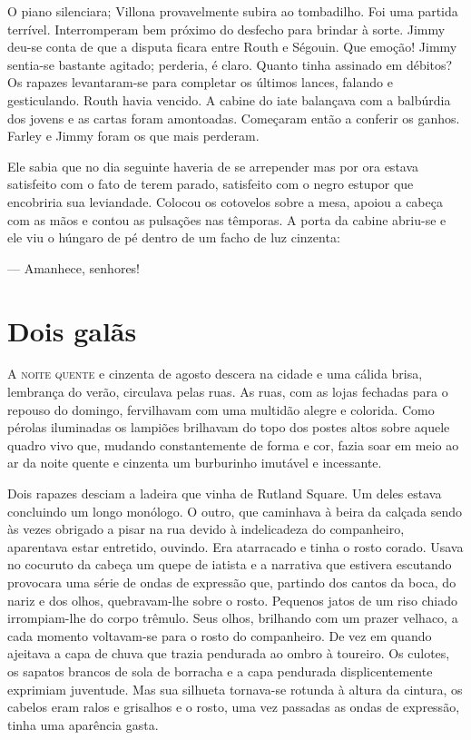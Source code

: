 O piano silenciara; Villona provavelmente subira ao tombadilho. Foi
uma partida terrível. Interromperam bem próximo do desfecho para
brindar à sorte. Jimmy deu-se conta de que a disputa ficara entre
Routh e Ségouin. Que emoção! Jimmy sentia-se bastante agitado;
perderia, é claro. Quanto tinha assinado em débitos? Os rapazes
levantaram-se para completar os últimos lances, falando e
gesticulando. Routh havia vencido. A cabine do iate balançava com a
balbúrdia dos jovens e as cartas foram amontoadas. Começaram então a
conferir os ganhos. Farley e Jimmy foram os que mais perderam.

Ele sabia que no dia seguinte haveria de se arrepender mas por ora
estava satisfeito com o fato de terem parado, satisfeito com o negro
estupor que encobriria sua leviandade. Colocou os cotovelos sobre a
mesa, apoiou a cabeça com as mãos e contou as pulsações nas têmporas.
A porta da cabine abriu-se e ele viu o húngaro de pé dentro de um
facho de luz cinzenta:

--- Amanhece, senhores!

\chapter{Dois galãs}

\textsc{A noite quente} e cinzenta de agosto descera na cidade e uma cálida
brisa, lembrança do verão, circulava pelas ruas. As ruas, com as lojas
fechadas para o repouso do domingo, fervilhavam com uma multidão
alegre e colorida. Como pérolas iluminadas os lampiões brilhavam do
topo dos postes altos sobre aquele quadro vivo que, mudando
constantemente de forma e cor, fazia soar em meio ao ar da noite
quente e cinzenta um burburinho imutável e incessante.

Dois rapazes desciam a ladeira que vinha de Rutland Square. Um deles
estava concluindo um longo monólogo. O outro, que caminhava à beira da
calçada sendo às vezes obrigado a pisar na rua devido à indelicadeza
do companheiro, aparentava estar entretido, ouvindo. Era atarracado
e tinha o rosto corado. Usava no cocuruto da cabeça um quepe de
iatista e a narrativa que estivera escutando provocara uma série de
ondas de expressão que, partindo dos cantos da boca, do nariz e dos
olhos, quebravam-lhe sobre o rosto. Pequenos jatos de um riso chiado
irrompiam-lhe do corpo trêmulo. Seus olhos, brilhando com um prazer
velhaco, a cada momento voltavam-se para o rosto do companheiro. De
vez em quando ajeitava a capa de chuva que trazia pendurada ao ombro à
toureiro. Os culotes, os sapatos brancos de sola de
borracha e a capa pendurada displicentemente exprimiam juventude. Mas sua
silhueta tornava-se rotunda à altura da cintura, os cabelos eram ralos
e grisalhos e o rosto, uma vez passadas as ondas de expressão, tinha
uma aparência gasta.

